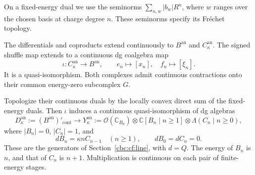 On a fixed-energy dual we use the seminorms
\(\sum_{n,w}|b_w|R^n\), where \(w\) ranges over the chosen basis
at charge degree \(n\). These seminorms specify its Fr\'echet topology.

\begin{theorem}\label{cbc:rc:an:thm:bar}
The differentials and coproducts extend continuously to
\(B^{\mathrm{an}}\) and \(C^{\mathrm{an}}_\kappa\). The signed shuffle
map extends to a continuous dg coalgebra map
\begin{equation}\label{cbc:rc:an:eq:shuffle}
 \iota:C^{\mathrm{an}}_\kappa\longrightarrow B^{\mathrm{an}},
 \qquad e_n\longmapsto[x_n],\quad f_n\longmapsto[\xi_n].
\end{equation}
It is a quasi-isomorphism. Both complexes admit continuous contractions
onto their common energy-zero subcomplex \(G\).

Topologize their continuous duals by the locally convex direct sum of
the fixed-energy duals. Then \(\iota\) induces a continuous
quasi-isomorphism of dg algebras
\begin{equation}\label{cbc:rc:an:eq:dual-map}
 D^{\mathrm{an}}_\kappa:=(B^{\mathrm{an}})'_{\mathrm{cont}}
 \longrightarrow
 Y^{\mathrm{an}}_\kappa
 :=\mathcal O(\mathbb C_{B_0})\otimes
      \mathbb C[B_n\mid n\geq1]\otimes
      \Lambda(C_n\mid n\geq0),
\end{equation}
where \(|B_n|=0\), \(|C_n|=1\), and
\begin{equation}\label{cbc:rc:an:eq:dual-d}
 dB_n=\kappa nC_{n-1}\quad(n\geq1),
 \qquad dB_0=dC_n=0.
\end{equation}
These are the generators of Section~\ref{cbc:cf:line}, with \(d=Q\).
The energy of \(B_n\) is \(n\), and that of \(C_n\) is
\(n+1\). Multiplication is continuous on each pair of finite-energy
stages.
\end{theorem}
